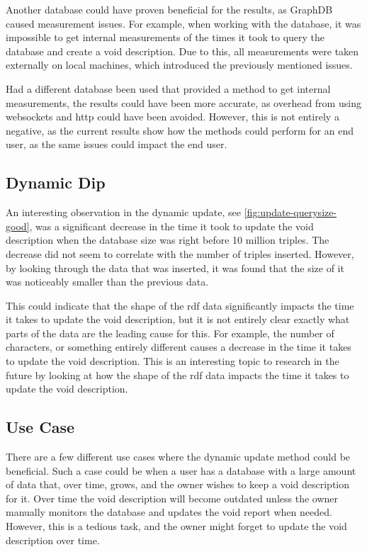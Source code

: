 Another database could have proven beneficial for the results, as GraphDB caused measurement issues. For example, when working with the database, it was impossible to get internal measurements of the times it took to query the database and create a \gls{void} description. Due to this, all measurements were taken externally on local machines, which introduced the previously mentioned issues.

Had a different database been used that provided a method to get internal measurements, the results could have been more accurate, as overhead from using websockets and http could have been avoided. However, this is not entirely a negative, as the current results show how the methods could perform for an end user, as the same issues could impact the end user.

\subsection{Dynamic Dip}\label{subsec:dynamic-dip}
An interesting observation in the dynamic update, see \autoref{fig:update-querysize-good}, was a significant decrease in the time it took to update the \gls{void} description when the database size was right before 10 million triples. The decrease did not seem to correlate with the number of triples inserted. However, by looking through the data that was inserted, it was found that the size of it was noticeably smaller than the previous data.

This could indicate that the shape of the \gls{rdf} data significantly impacts the time it takes to update the \gls{void} description, but it is not entirely clear exactly what parts of the data are the leading cause for this. For example, the number of characters, or something entirely different causes a decrease in the time it takes to update the \gls{void} description. This is an interesting topic to research in the future by looking at how the shape of the \gls{rdf} data impacts the time it takes to update the \gls{void} description.

\subsection{Use Case}\label{subsec:use-case}
There are a few different use cases where the dynamic update method could be beneficial. Such a case could be when a user has a database with a large amount of data that, over time, grows, and the owner wishes to keep a \gls{void} description for it. Over time the \gls{void} description will become outdated unless the owner manually monitors the database and updates the \gls{void} report when needed. However, this is a tedious task, and the owner might forget to update the \gls{void} description over time.

